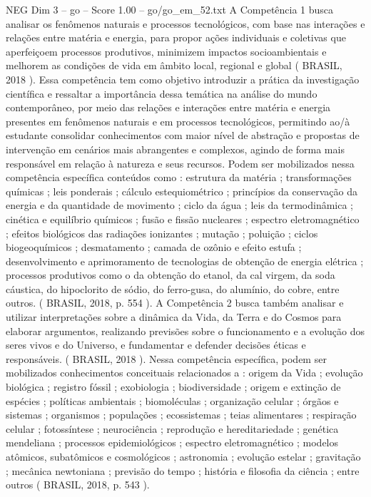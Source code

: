 \begin{textsample}{NEG Dim 3 – go – Score 1.00 – go/go\_em\_52.txt}
A Competência 1 busca analisar os fenômenos naturais e processos tecnológicos, com base nas interações e relações entre matéria e energia, para propor ações individuais e coletivas que aperfeiçoem processos produtivos, minimizem impactos socioambientais e melhorem as condições de vida em âmbito local, regional e global ( BRASIL, 2018 ).
Essa competência tem como objetivo introduzir a prática da investigação científica e ressaltar a importância dessa temática na análise do mundo contemporâneo, por meio das relações e interações entre matéria e energia presentes em fenômenos naturais e em processos tecnológicos, permitindo ao/à estudante consolidar conhecimentos com maior nível de abstração e propostas de intervenção em cenários mais abrangentes e complexos, agindo de forma mais responsável em relação à natureza e seus recursos.
Podem ser mobilizados nessa competência específica conteúdos como : estrutura da matéria ; transformações químicas ; leis ponderais ; cálculo estequiométrico ; princípios da conservação da energia e da quantidade de movimento ; ciclo da água ; leis da termodinâmica ; cinética e equilíbrio químicos ; fusão e fissão nucleares ; espectro eletromagnético ; efeitos biológicos das radiações ionizantes ; mutação ; poluição ; ciclos biogeoquímicos ; desmatamento ; camada de ozônio e efeito estufa ; desenvolvimento e aprimoramento de tecnologias de obtenção de energia elétrica ; processos produtivos como o da obtenção do etanol, da cal virgem, da soda cáustica, do hipoclorito de sódio, do ferro-gusa, do alumínio, do cobre, entre outros. ( BRASIL, 2018, p. 554 ).
A Competência 2 busca também analisar e utilizar interpretações sobre a dinâmica da Vida, da Terra e do Cosmos para elaborar argumentos, realizando previsões sobre o funcionamento e a evolução dos seres vivos e do Universo, e fundamentar e defender decisões éticas e responsáveis. ( BRASIL, 2018 ).
Nessa competência específica, podem ser mobilizados conhecimentos conceituais relacionados a : origem da Vida ; evolução biológica ; registro fóssil ; exobiologia ; biodiversidade ; origem e extinção de espécies ; políticas ambientais ; biomoléculas ; organização celular ; órgãos e sistemas ; organismos ; populações ; ecossistemas ; teias alimentares ; respiração celular ; fotossíntese ; neurociência ; reprodução e hereditariedade ; genética mendeliana ; processos epidemiológicos ; espectro eletromagnético ; modelos atômicos, subatômicos e cosmológicos ; astronomia ; evolução estelar ; gravitação ; mecânica newtoniana ; previsão do tempo ; história e filosofia da ciência ; entre outros ( BRASIL, 2018, p. 543 ).

\end{textsample}
